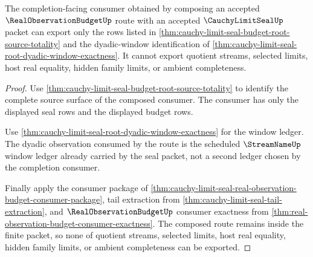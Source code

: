 \begin{theorem}
\label{thm:cauchy-limit-seal-root-completion-consumer-nonescape}
The completion-facing consumer obtained by composing an accepted $\RealObservationBudgetUp$ route with an accepted $\CauchyLimitSealUp$ packet can export only the rows listed in \autoref{thm:cauchy-limit-seal-budget-root-source-totality} and the dyadic-window identification of \autoref{thm:cauchy-limit-seal-root-dyadic-window-exactness}. It cannot export quotient streams, selected limits, host real equality, hidden family limits, or ambient completeness.
\end{theorem}
\begin{proof}
Use \autoref{thm:cauchy-limit-seal-budget-root-source-totality} to identify the complete source surface of the composed consumer. The consumer has only the displayed seal rows and the displayed budget rows.

Use \autoref{thm:cauchy-limit-seal-root-dyadic-window-exactness} for the window ledger. The dyadic observation consumed by the route is the scheduled $\StreamNameUp$ window ledger already carried by the seal packet, not a second ledger chosen by the completion consumer.

Finally apply the consumer package of \autoref{thm:cauchy-limit-seal-real-observation-budget-consumer-package}, tail extraction from \autoref{thm:cauchy-limit-seal-tail-extraction}, and $\RealObservationBudgetUp$ consumer exactness from \autoref{thm:real-observation-budget-consumer-exactness}. The composed route remains inside the finite packet, so none of quotient streams, selected limits, host real equality, hidden family limits, or ambient completeness can be exported.
\end{proof}

